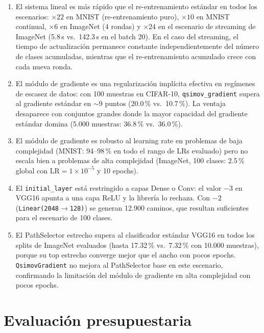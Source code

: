 \begin{enumerate}
  \item El sistema lineal es más rápido que el re-entrenamiento estándar en todos los
        escenarios: $\times 22$ en MNIST (re-entrenamiento puro), $\times 10$ en MNIST continual,
        $\times 6$ en ImageNet (4 rondas) y $\times 24$ en el escenario de streaming de ImageNet
        (5.8\,s vs.\ 142.3\,s en el batch 20). En el caso del streaming, el tiempo de actualización
        permanece constante independientemente del número de clases acumuladas, mientras que el
        re-entrenamiento acumulado crece con cada nueva ronda.

  \item El módulo de gradiente es una regularización implícita efectiva en regímenes de
        escasez de datos: con 100 muestras en CIFAR-10, \texttt{qsimov\_gradient} supera al
        gradiente estándar en $\sim$9 puntos (20.0\,\% vs.\ 10.7\,\%). La ventaja desaparece con
        conjuntos grandes donde la mayor capacidad del gradiente estándar domina (5.000 muestras:
        36.8\,\% vs.\ 36.0\,\%).

  \item El módulo de gradiente es robusto al learning rate en problemas de baja
        complejidad (MNIST: 94--98\,\% en todo el rango de LRs evaluado) pero no escala bien a
        problemas de alta complejidad (ImageNet, 100 clases: 2.5\,\% global con
        LR$=1\times 10^{-5}$ y 10 epochs).

  \item El \texttt{initial\_layer} está restringido a capas Dense o Conv: el valor $-3$ en
        VGG16 apunta a una capa ReLU y la librería lo rechaza. Con $-2$
        (\texttt{Linear(2048}$\rightarrow$\texttt{128)}) se generan 12.900 caminos, que resultan
        suficientes para el escenario de 100 clases.

  \item El PathSelector estrecho supera al clasificador estándar VGG16 en todos los splits de
        ImageNet evaluados (hasta 17.32\,\% vs.\ 7.32\,\% con 10.000 muestras), porque su top
        estrecho converge mejor que el ancho con pocos epochs. \texttt{QsimovGradient} no mejora
        al PathSelector base en este escenario, confirmando la limitación del módulo de gradiente
        en alta complejidad con pocos epochs.
\end{enumerate}

\section{Evaluación presupuestaria}

